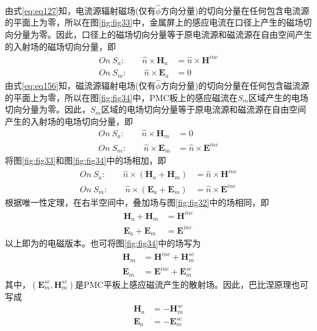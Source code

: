 \documentclass{article}
\numberwithin{equation}{section}
\begin{document}
\\
由式\ref{eq:eq127}知，电流源辐射磁场(仅有$\hat{\phi}$方向分量)的切向分量在任何包含电流源的平面上为零，所以在图\ref{fig:fig33}中，金属屏上的感应电流在口径上产生的磁场切向分量为零。因此，口径上的磁场切向分量等于原电流源和磁流源在自由空间产生的入射场的磁场切向分量，即
\begin{align}
    \label{eq:eq256}
    On~S_a:\qquad\hat{n}\times\mathbf{H}_a&=\hat{n}\times\mathbf{H}^{inc} \\
    \label{eq:eq257}
    On~S_m:\qquad\hat{n}\times\mathbf{E}_a&=0
\end{align}
由式\ref{eq:eq156}知，磁流源辐射电场(仅有$\hat{\phi}$方向分量)的切向分量在任何包含磁流源的平面上为零，所以在图\ref{fig:fig34}中，PMC板上的感应磁流在$S_m$区域产生的电场切向分量为零。因此，$S_m$区域的电场切向分量等于原电流源和磁流源在自由空间产生的入射场的电场切向分量，即
\begin{align}
    \label{eq:eq258}
    On~S_a:\qquad\hat{n}\times\mathbf{H}_m&=0 \\
    \label{eq:eq259}
    On~S_m:\qquad\hat{n}\times\mathbf{E}_m&=\hat{n}\times\mathbf{E}^{inc}
\end{align}
将图\ref{fig:fig33}和图\ref{fig:fig34}中的场相加，即
\begin{align}
    \label{eq:eq260}
    On~S_a:\qquad\hat{n}\times(\mathbf{H}_a+\mathbf{H}_m)&=\hat{n}\times\mathbf{H}^{inc} \\
    \label{eq:eq261}
    On~S_m:\qquad\hat{n}\times(\mathbf{E}_a+\mathbf{E}_m)&=\hat{n}\times\mathbf{E}^{inc}
\end{align}
根据唯一性定理，在右半空间中，叠加场与图\ref{fig:fig32}中的场相同，即
\begin{align}
    \label{eq:eq262}
    \mathbf{H}_a+\mathbf{H}_m&=\mathbf{H}^{inc} \\
    \label{eq:eq263}
    \mathbf{E}_a+\mathbf{E}_m&=\mathbf{E}^{inc}
\end{align}
以上即为\textbf{\color{blue}{巴比涅原理}}的电磁版本。也可将图\ref{fig:fig34}中的场写为
\begin{align}
    \label{eq:eq264}
    \mathbf{H}_m&=\mathbf{H}^{inc}+\mathbf{H}_m^{sc} \\
    \label{eq:eq265}
    \mathbf{E}_m&=\mathbf{E}^{inc}+\mathbf{E}_m^{sc}
\end{align}
其中，$(\mathbf{E}_m^{sc},\mathbf{H}_m^{sc})$是PMC平板上感应磁流产生的散射场。因此，巴比涅原理也可写成
\begin{align}
    \label{eq:eq266}
    \mathbf{H}_a&=-\mathbf{H}_m^{sc} \\
    \label{eq:eq267}
    \mathbf{E}_a&=-\mathbf{E}_m^{sc}
\end{align}
\end{document}
